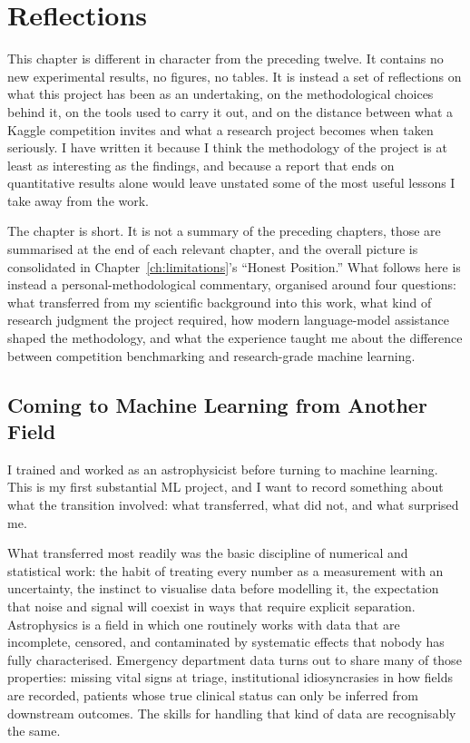 
\chapter{Reflections}
\label{ch:reflections}

This chapter is different in character from the preceding twelve. It contains no new experimental results, no figures, no tables. It is instead a set of reflections on what this project has been as an undertaking, on the methodological choices behind it, on the tools used to carry it out, and on the distance between what a Kaggle competition invites and what a research project becomes when taken seriously. I have written it because I think the methodology of the project is at least as interesting as the findings, and because a report that ends on quantitative results alone would leave unstated some of the most useful lessons I take away from the work.

The chapter is short. It is not a summary of the preceding chapters, those are summarised at the end of each relevant chapter, and the overall picture is consolidated in Chapter~\ref{ch:limitations}'s ``Honest Position.'' What follows here is instead a personal-methodological commentary, organised around four questions: what transferred from my scientific background into this work, what kind of research judgment the project required, how modern language-model assistance shaped the methodology, and what the experience taught me about the difference between competition benchmarking and research-grade machine learning.

\section{Coming to Machine Learning from Another Field}

I trained and worked as an astrophysicist before turning to machine learning. This is my first substantial ML project, and I want to record something about what the transition involved: what transferred, what did not, and what surprised me.

What transferred most readily was the basic discipline of numerical and statistical work: the habit of treating every number as a measurement with an uncertainty, the instinct to visualise data before modelling it, the expectation that noise and signal will coexist in ways that require explicit separation. Astrophysics is a field in which one routinely works with data that are incomplete, censored, and contaminated by systematic effects that nobody has fully characterised. Emergency department data turns out to share many of those properties: missing vital signs at triage, institutional idiosyncrasies in how fields are recorded, patients whose true clinical status can only be inferred from downstream outcomes. The skills for handling that kind of data are recognisably the same.

